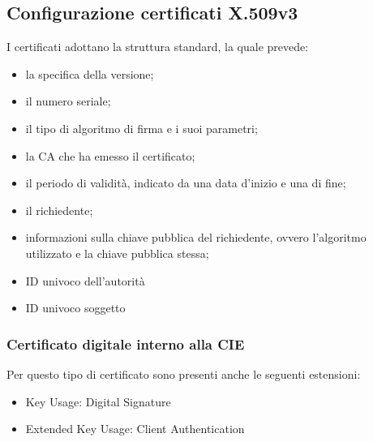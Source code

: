         \subsection{Configurazione certificati X.509v3}
            I certificati adottano la struttura standard, la quale prevede:
            \begin{multicols}{2}
                \begin{itemize}
                    \item la specifica della versione;
                        
                    \item il numero seriale;
    
                    \item il tipo di algoritmo di firma e i suoi parametri;
    
                    \item la CA che ha emesso il certificato;
    
                    \item il periodo di validità, indicato da una data d'inizio e una di fine;
    
                    \item il richiedente;
    
                    \item informazioni sulla chiave pubblica del richiedente, ovvero l'algoritmo utilizzato e la chiave pubblica stessa;
    
                    \item ID univoco dell'autorità
                        
                    \item ID univoco soggetto
                \end{itemize}
            \end{multicols}
                
            \subsubsection{Certificato digitale interno alla CIE}
                Per questo tipo di certificato sono presenti anche le seguenti estensioni:
                
                \begin{itemize}
                    \item Key Usage: Digital Signature
                    
                    \item Extended Key Usage: Client Authentication
                \end{itemize}

